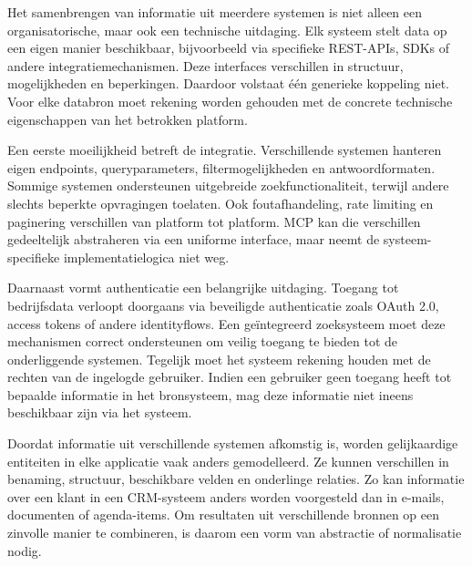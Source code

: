 Het samenbrengen van informatie uit meerdere systemen is niet alleen een organisatorische, maar ook een technische uitdaging. Elk systeem stelt data op een eigen manier beschikbaar, bijvoorbeeld via specifieke \gls{REST}-\glspl{API}, \glspl{SDK} of andere integratiemechanismen. Deze interfaces verschillen in structuur, mogelijkheden en beperkingen. Daardoor volstaat één generieke koppeling niet. Voor elke databron moet rekening worden gehouden met de concrete technische eigenschappen van het betrokken platform.


Een eerste moeilijkheid betreft de integratie. Verschillende systemen hanteren eigen endpoints, queryparameters, filtermogelijkheden en antwoordformaten. Sommige systemen ondersteunen uitgebreide zoekfunctionaliteit, terwijl andere slechts beperkte opvragingen toelaten. Ook foutafhandeling, rate limiting en paginering verschillen van platform tot platform. \gls{MCP} kan die verschillen gedeeltelijk abstraheren via een uniforme interface, maar neemt de systeem-specifieke implementatielogica niet weg.

Daarnaast vormt authenticatie een belangrijke uitdaging. Toegang tot bedrijfsdata verloopt doorgaans via beveiligde authenticatie zoals \gls{OAuth} 2.0, access tokens of andere identityflows. Een geïntegreerd zoeksysteem moet deze mechanismen correct ondersteunen om veilig toegang te bieden tot de onderliggende systemen. Tegelijk moet het systeem rekening houden met de rechten van de ingelogde gebruiker. Indien een gebruiker geen toegang heeft tot bepaalde informatie in het bronsysteem, mag deze informatie niet ineens beschikbaar zijn via het systeem.

Doordat informatie uit verschillende systemen afkomstig is, worden gelijkaardige entiteiten in elke applicatie vaak anders gemodelleerd. Ze kunnen verschillen in benaming, structuur, beschikbare velden en onderlinge relaties. Zo kan informatie over een klant in een \gls{CRM}-systeem anders worden voorgesteld dan in e-mails, documenten of agenda-items. Om resultaten uit verschillende bronnen op een zinvolle manier te combineren, is daarom een vorm van abstractie of normalisatie nodig.


